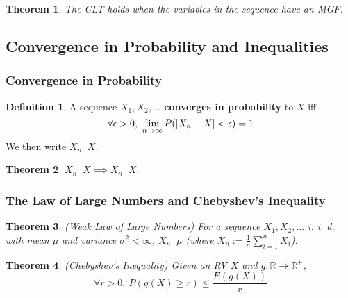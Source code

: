 \documentclass[12pt]{article}
\newtheorem{thm}{Theorem}[section]
\theoremstyle{definition}
\newtheorem{defn}{Definition}[subsection]
\DeclarePairedDelimiter\abs{\lvert}{\rvert}
\newcommand{\R}{\mathbb{R}}
\DeclareMathOperator{\distto}{\xrightarrow{\mathcal{D}}}
\DeclareMathOperator{\probto}{\xrightarrow{\mathcal{P}}}
\begin{document}

\begin{thm}
  The CLT holds when the variables in the sequence have an MGF.
\end{thm}


\subsection{Convergence in Probability and Inequalities}

\subsubsection{Convergence in Probability}

\begin{defn}
  A sequence $X_1, X_2, \ldots$ \textbf{converges in probability} to $X$ iff
  $$\forall \epsilon > 0,\ \lim_{n \to \infty}P(\abs{X_n - X} < \epsilon) = 1$$
  We then write $X_n \probto X$.
\end{defn}


\begin{thm}
  $X_n \probto X \implies X_n \distto X$.
\end{thm}


\subsubsection{The Law of Large Numbers and Chebyshev's Inequality}


\begin{thm}
  (Weak Law of Large Numbers)
  For a sequence $X_1, X_2, \ldots$ i. i. d. with mean $\mu$ and variance $\sigma^2 < \infty$, $\overline{X}_n \probto \mu$ (where $\overline{X}_n := \frac{1}{n}\sum_{i = 1}^nX_i$).
\end{thm}



\begin{thm}
  (Chebyshev's Inequality)
  Given an RV $X$ and $g : \R \to \R^+$,
  $$\forall r > 0,\ P(g(X) \geq r) \leq \frac{E(g(X))}{r}$$
\end{thm}
\end{document}
